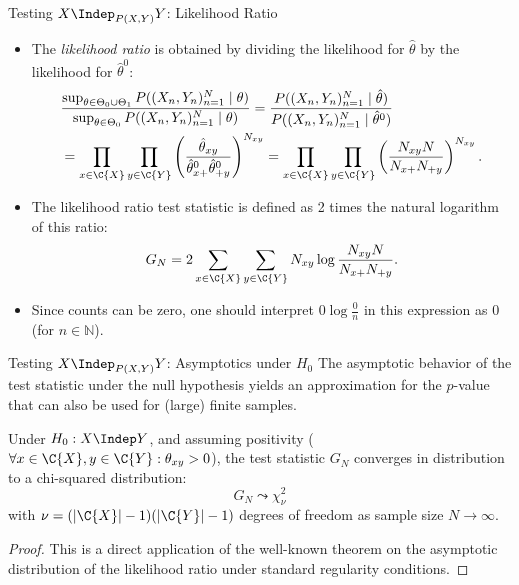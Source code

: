 \begin{frame}{Testing $X \Indep_{P(X,Y)} Y$: Likelihood Ratio}
  \begin{itemize}
    \item The \emph{likelihood ratio} is obtained by dividing the likelihood for $\hat \theta$ by the likelihood for $\hat \theta^0$:
  \begin{equation*}\begin{split}
  & \frac{\sup_{\theta\in\Theta_0\cup\Theta_1} P((X_n,Y_n)_{n=1}^N \mid \theta)}{\sup_{\theta\in\Theta_0} P((X_n,Y_n)_{n=1}^N \mid \theta)}
    = \frac{P((X_n,Y_n)_{n=1}^N \mid \hat\theta)}{P((X_n,Y_n)_{n=1}^N \mid \hat\theta^0)} \\
  & = \prod_{x\in\C{X}} \prod_{y\in\C{Y}} \left(\frac{\hat \theta_{xy}}{\hat \theta^0_{x+} \hat \theta^0_{+ y}}\right)^{N_{xy}} 
    = \prod_{x\in\C{X}} \prod_{y\in\C{Y}} \left(\frac{N_{xy} N}{N_{x+} N_{+ y}}\right)^{N_{xy}}.
\end{split}\end{equation*}
\item The likelihood ratio test statistic is defined as 2 times the natural logarithm of this ratio:
\begin{equation*}
  G_N %
  = 2 \sum_{x\in\C{X}} \sum_{y\in\C{Y}} N_{xy} \log \frac{N_{xy} N}{N_{x+} N_{+ y}}.
\end{equation*}
\item Since counts can be zero, one should interpret $0 \log \frac{0}{n}$ in this expression as $0$ (for $n \in \mathbb{N}$).
  \end{itemize}
\end{frame}

\begin{frame}{Testing $X \Indep_{P(X,Y)} Y$: Asymptotics under $H_0$}
The asymptotic behavior of the test statistic under the null hypothesis yields
an approximation for the $p$-value that can also be used for (large) finite samples.
\begin{Prp}
Under $H_0 : X \Indep Y$, and assuming positivity ($\forall x \in \C{X}, y\in \C{Y}: \theta_{xy} > 0$),
the test statistic $G_N$ converges in distribution to a chi-squared distribution:
$$G_N \leadsto \chi_\nu^2$$
with $\nu = (|\C{X}| - 1)(|\C{Y}| - 1)$ degrees of freedom as sample size $N \to \infty$.
\end{Prp}
\begin{proof}
  This is a direct application of the well-known theorem on the asymptotic distribution of the likelihood ratio under standard regularity conditions.
\end{proof}
\end{frame}


